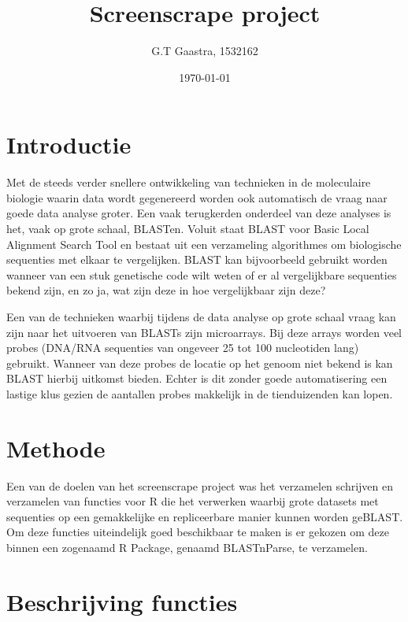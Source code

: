 \documentclass[a4paper]{article}
\title{Screenscrape project}
\author{G.T Gaastra, 1532162}
\date{\today}
\begin{document}
\maketitle


\section*{Introductie}
Met de steeds verder snellere ontwikkeling van technieken in de moleculaire biologie waarin data wordt gegenereerd worden ook automatisch de vraag naar goede data analyse groter. Een vaak terugkerden onderdeel van deze analyses is het, vaak op grote schaal, BLASTen. Voluit staat BLAST voor Basic Local Alignment Search Tool en bestaat uit een verzameling algorithmes om biologische sequenties met elkaar te vergelijken. BLAST kan bijvoorbeeld gebruikt worden wanneer van een stuk genetische code wilt weten of er al vergelijkbare sequenties bekend zijn, en zo ja, wat zijn deze in hoe vergelijkbaar zijn deze?

Een van de technieken waarbij tijdens de data analyse op grote schaal vraag kan zijn naar het uitvoeren van BLASTs zijn microarrays. Bij deze arrays worden veel probes (DNA/RNA sequenties van ongeveer 25 tot 100 nucleotiden lang) gebruikt. Wanneer van deze probes de locatie op het genoom niet bekend is kan BLAST hierbij uitkomst bieden. Echter is dit zonder goede automatisering een lastige klus gezien de aantallen probes makkelijk in de tienduizenden kan lopen. 

\section*{Methode}
Een van de doelen van het screenscrape project was het verzamelen schrijven en verzamelen van functies voor R\cite{Rcran} die het verwerken waarbij grote datasets met sequenties op een gemakkelijke en repliceerbare manier kunnen worden geBLAST.  Om deze functies uiteindelijk goed beschikbaar te maken is er gekozen om deze binnen een zogenaamd R Package, genaamd BLASTnParse, te verzamelen.

\section*{Beschrijving functies}
\end{document}
